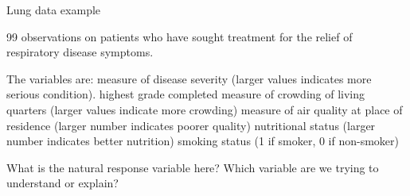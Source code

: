 \documentclass[table]{beamer}\usepackage[]{graphicx}\usepackage[]{color}
\begin{document}
%
%
%
%




\begin{frame}[t]{Lung data example}

99 observations on patients who have sought treatment for the relief of respiratory disease symptoms.

The variables are:
\bi
     measure of disease severity (larger values indicates more serious condition).
     highest grade completed
     measure of crowding of living quarters (larger values indicate more crowding)
     measure of air quality at place of residence (larger number indicates poorer quality)
     nutritional status (larger number indicates better nutrition)
     smoking status (1 if smoker, 0 if non-smoker)
\ei

What is the natural response variable here? Which variable are we trying to understand or explain?

\end{frame}


\end{document}
